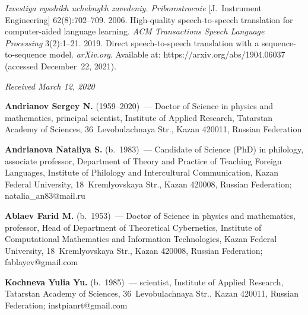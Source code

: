 \begin{multicols}{2}
{{\begin{thebibliography}{99}
\textit{Izvestiya vysshikh uchebnykh zavedeniy. Priborostroenie} [J.~Instrument Engineering]  
62(8):702--709.
 2006. High-quality speech-to-speech translation for computer-aided 
language learning. \textit{ACM Transactions Speech Language Processing} 3(2):1--21.
 2019. Direct 
speech-to-speech translation with a sequence-to-sequence model. \textit{arXiv.org}. Available at: {\sf 
https://arxiv.org/abs/1904.06037} (accessed December~22, 2021).
\end{thebibliography}

 }
 }

\end{multicols}

\vspace*{-12pt}

\hfill{\small\textit{Received March 12, 2020}}

\pagebreak


\Contr

\noindent
\textbf{Andrianov Sergey N.} (1959--2020)~--- Doctor of Science in physics and mathematics, principal 
scientist, Institute of Applied Research, Tatarstan Academy of Sciences, 36~Levobulachnaya Str., Kazan 
420011, Russian Federation

\vspace*{3pt}

\noindent
\textbf{Andrianova Nataliya S.} (b.\ 1983)~--- Candidate of Science (PhD) in philology, associate professor, 
Department of Theory and Practice of Teaching Foreign Languages, Institute of Philology and Intercultural 
Communication, Kazan Federal University, 18~Kremlyovskaya Str., Kazan 420008, Russian Federation; 
\mbox{natalia\_an83@mail.ru} 

\vspace*{3pt}

\noindent
\textbf{Ablaev Farid M.} (b.\ 1953)~--- Doctor of Science in physics and mathematics, professor, Head of 
Department of Theoretical Cybernetics, Institute of Computational Mathematics and Information 
Technologies, Kazan Federal University, 18~Kremlyovskaya Str., Kazan 420008, Russian Federation; 
\mbox{fablayev@gmail.com}

\vspace*{3pt}

\noindent
\textbf{Kochneva Yulia Yu.} (b.\ 1985)~--- scientist, Institute of Applied Research, Tatarstan Academy of 
Sciences, 36~Levobulachnaya Str., Kazan 420011, Russian Federation; \mbox{instpianrt@gmail.com}




\label{end\stat}

\renewcommand{\bibname}{\protect\rm Литература} 